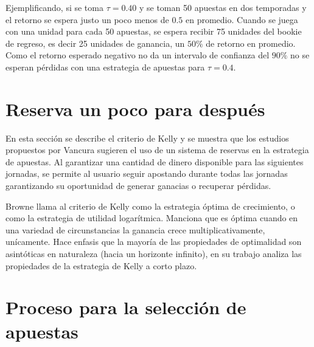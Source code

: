 Ejemplificando, si se toma $\tau = 0.40$ y se toman 50 apuestas en dos temporadas y el retorno se espera justo un poco menos de $0.5$ en promedio. Cuando se juega con una unidad para cada 50 apuestas, se espera recibir 75 unidades del bookie de regreso, es decir 25 unidades de ganancia, un $50\%$ de retorno en promedio. Como el retorno esperado negativo no da un intervalo de confianza del $90\%$ no se esperan pérdidas con una estrategia de apuestas para $\tau = 0.4$.

\section{Reserva un poco para después}
\label{sec:kelly}

En esta sección se describe el criterio de Kelly \cite{kelly1956new} y se muestra que los estudios propuestos por Vancura \cite{vancura2000finding} sugieren el uso de un sistema de reservas en la estrategia de apuestas. Al garantizar una cantidad de dinero disponible para las siguientes jornadas, se permite al usuario seguir apostando durante todas las jornadas garantizando su oportunidad de generar ganacias o recuperar pérdidas.


Browne \cite{browne2000can} llama al criterio de Kelly \cite{kelly1956new} como la estrategia óptima de crecimiento, o como la estrategia de utilidad logarítmica. Manciona que es óptima cuando en una variedad de circunstancias la ganancia crece multiplicativamente, unícamente. Hace enfasis 	que la mayoría de las propiedades de optimalidad son asintóticas en naturaleza (hacia un horizonte infinito), en su trabajo analiza las propiedades de la estrategia de Kelly a corto plazo.

\cite{kelly1956new}
\cite{vancura2000finding}

 \section{Proceso para la selección de apuestas}

%
%
 
